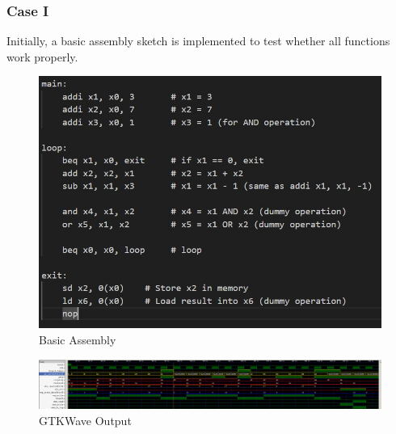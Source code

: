 \documentclass{article}
\numberwithin{figure}{section}
\numberwithin{table}{section}
\begin{document}
\subsubsection*{Case I}
Initially, a basic assembly sketch is implemented to test whether all functions work properly.
\begin{figure}[H]
    \centering
    \includegraphics[width=1\linewidth]{basic_test_sequential.jpg}
    \caption{Basic Assembly}
    \label{fig:basic-test}
\end{figure}
\begin{figure}[H]
    \centering
    \includegraphics[width=1\linewidth]{Basic_sequential_test_gtkwave.png}
    \caption{GTKWave Output}
    \label{fig:gtkwave-output}
\end{figure}
\end{document}
